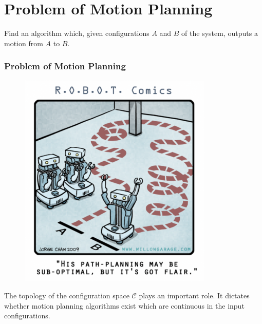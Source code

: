 \documentclass{beamer}
\begin{document}

\section{Problem of Motion Planning}
\begin{frame}
    Find an algorithm which, given configurations $A$ and $B$ of the system, outputs a motion from $A$ to $B$.
    \frametitle{Problem of Motion Planning}
    \begin{figure}[H]
        \centering
        \includegraphics[scale=.3]{../images/planner.png}
    \end{figure}
    The topology of the configuration space $\mathcal{C}$ plays an important role. It dictates whether motion planning algorithms exist which are continuous in the input configurations.
\end{frame}
\end{document}

